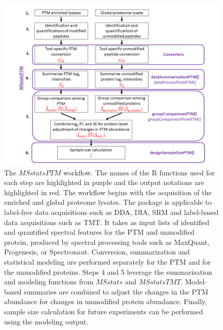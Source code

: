 \documentclass[mcp]{article}
\numberwithin{table}{section}
\begin{document}
\begin{figure}[ht]
\centering
\includegraphics[scale=.55]{images/MSstatsPTM_design.png}
\caption{The $MSstatsPTM$ workflow. The names of the R functions used for each step are highlighted in purple and the output notations are highlighted in red. The workflow begins with the acquisition of the enriched and global proteome lysates. The package is applicable to label-free data acquisitions such as DDA, DIA, SRM and label-based data acquisitions such as TMT. It takes as input lists of identified and quantified spectral features for the PTM and unmodified protein, produced by spectral processing tools such as MaxQuant, Progenesis, or Spectronaut.  Conversion, summarization and statistical modeling are performed separately for the PTM and for the unmodified proteins. Steps 4 and 5 leverage the summarization and modeling functions from $MSstats$ and $MSstatsTMT$. Model-based summaries are combined to adjust the changes in the PTM abundance for changes in unmodified protein abundance. Finally, sample size calculation for future experiments can be performed using the modeling output.}
\label{fig:msstatsptm_design}
\end{figure}
\end{document}
